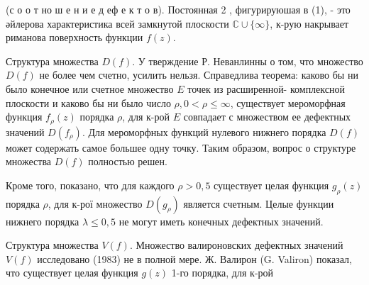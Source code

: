 \documentclass[10pt]{article}
\begin{document}
(с о о т но ш е н и е д еф е к т о в). Постоянная 2 , фигурируюшая в (1), - это әйлерова характеристика всей замкнутой плоскости $\mathbb{C} \cup\{\infty\}$, к-рую накрывает риманова поверхность функции $f(z)$.



Структура множества $D(f)$. У тверждение Р. Неванлинны о том, что множество $D(f)$ не более чем счетно, усилить нельзя. Справедлива теорема: каково бы ни было конечное или счетное множество $E$ точек из расширенной- комплексной плоскости и каково бы ни было число $\rho, 0<\rho \leqslant \infty$, существует мероморфная функция $f_{\rho}(z)$ порядка $\rho$, для к-рой $E$ совпадает с множеством ее дефектных значений $D\left(f_{\rho}\right)$. Для мероморфных функций нулевого нижнего порядка $D(f)$ может содержать самое большее одну точку. Таким образом, вопрос о структуре множества $D(f)$ полностью решен.



Кроме того, показано, что для каждого $\rho>0,5$ существует целая функция $g_{\rho}(z)$ порядка $\rho$, для к-рої множество $D\left(g_{\rho}\right)$ является счетным. Целые функции нижнего порядка $\lambda \leqslant 0,5$ не могут иметь конечных дефектных значений.



Структура множества $V(f)$. Множество валироновских дефектных значений $V(f)$ исследовано (1983) не в полной мере. Ж. Валирон (G. Valiron) показал, что существует целая функция $g(z)$ 1-го порядка, для к-рой
\end{document}
